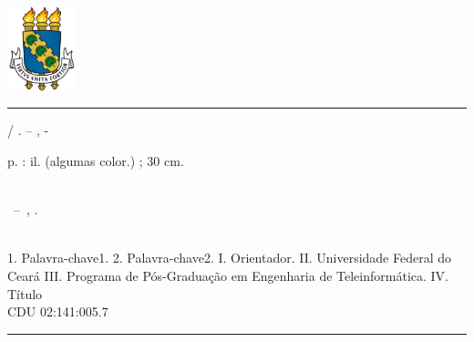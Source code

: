\documentclass[
	12pt,				%
	openright,			%
	twoside,			%
	a4paper,			%
	english,			%
  	brazil				%
	]{abntex2}
\renewcommand{\imprimircapa}{%

\begin{capa}%
\center
\includegraphics[width=0.15\textwidth]{brasao_ufc.png}\par
{\MakeUppercase{\bfseries\imprimirinstituicao}\par}
\vspace*{2.5cm}
{\MakeUppercase{\bfseries\imprimirautor}\par}
\vspace*{2.5cm}
{\MakeUppercase{\bfseries\imprimirtitulo}\par}
\vfill
{\MakeUppercase{\bfseries\imprimirlocal}\par}
{\bfseries\imprimirdata}
\vspace*{1cm}
\end{capa}
}
\begin{document}
\frenchspacing 


\imprimircapa

\imprimirfolhaderosto*


%
%     
\begin{fichacatalografica}
	\vspace*{\fill}					%
	\hrule							%
	\begin{center}					%
	\begin{minipage}[c]{12.5cm}		%
	
	\imprimirautor
	
	\hspace{0.5cm} \imprimirtitulo  / \imprimirautor. --
	\imprimirlocal, \imprimirdata-
	
	\hspace{0.5cm} \pageref{LastPage} p. : il. (algumas color.) ; 30 cm.\\
	
	\hspace{0.5cm} \imprimirorientadorRotulo~\imprimirorientador\\
	
	\hspace{0.5cm}
	\parbox[t]{\textwidth}{\imprimirtipotrabalho~--~\imprimirinstituicao,
	\imprimirdata.}\\
	
	\hspace{0.5cm}
		1. Palavra-chave1.
		2. Palavra-chave2.
		I. Orientador.
		II. Universidade Federal do Ceará
		III. Programa de Pós-Graduação em Engenharia de Teleinformática.
		IV. Título\\ 			
	
	\hspace{8.75cm} CDU 02:141:005.7\\
	
	\end{minipage}
	\end{center}
	\hrule
\end{fichacatalografica}
\end{document}
